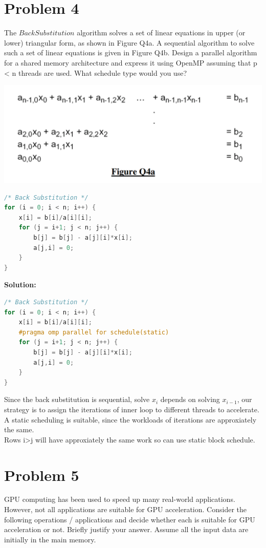 \documentclass{article}
\begin{document}
\section{Problem 4}
The $Back Substitution$ algorithm solves a set of linear equations in upper (or 
lower) triangular form, as shown in Figure Q4a. A sequential algorithm to solve 
such a set of linear equations is given in Figure Q4b. Design a parallel algorithm 
for a shared memory architecture and express it using OpenMP assuming that p 
< n threads are used. What schedule type would you use?
\begin{center}
    \includegraphics[scale = 0.25]{q4.png}\\
\end{center}
\begin{lstlisting}[language=c++]
/* Back Substitution */
for (i = 0; i < n; i++) { 
    x[i] = b[i]/a[i][i]; 
    for (j = i+1; j < n; j++) { 
        b[j] = b[j] - a[j][i]*x[i]; 
        a[j,i] = 0; 
    } 
}
\end{lstlisting}
\textbf{Solution: }
\begin{lstlisting}[language=c++]
/* Back Substitution */
for (i = 0; i < n; i++) { 
    x[i] = b[i]/a[i][i];
    #pragma omp parallel for schedule(static) 
    for (j = i+1; j < n; j++) { 
        b[j] = b[j] - a[j][i]*x[i]; 
        a[j,i] = 0; 
    } 
}
\end{lstlisting}
Since the back substitution is sequential, solve $x_{i}$ depends on solving $x_{i-1}$, our strategy is to assign the iterations of inner loop to different threads to accelerate. A static scheduling is suitable, since the workloads of iterations are approxiately the same.\\
Rows i>j will have approxiately the same work so can use static block schedule.

\pagebreak

\section{Problem 5}
GPU computing has been used to speed up many real-world applications. 
However, not all applications are suitable for GPU acceleration. Consider the 
following operations / applications and decide whether each is suitable for GPU 
acceleration or not. Briefly justify your answer. Assume all the input data are 
initially in the main memory.
\end{document}
